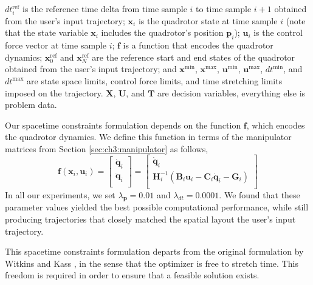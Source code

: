 $dt_i^{\text{ref}}$ is the reference time delta from time sample $i$ to time sample $i+1$ obtained from the user's input trajectory;
$\mathbf{x}_i$ is the quadrotor state at time sample $i$ (note that the state variable $\mathbf{x}_i$ includes the quadrotor's position $\mathbf{p}_i$);
$\mathbf{u}_i$ is the control force vector at time sample $i$;
$\mathbf{f}$ is a function that encodes the quadrotor dynamics;
$\mathbf{x}_0^{\text{ref}}$ and $\mathbf{x}_N^{\text{ref}}$ are the reference start and end states of the quadrotor obtained from the user's input trajectory;
and $\mathbf{x}^{\text{min}}$, $\mathbf{x}^{\text{max}}$, $\mathbf{u}^{\text{min}}$, $\mathbf{u}^{\text{max}}$, $dt^{\text{min}}$, and $dt^{\text{max}}$ are state space limits, control force limits, and time stretching limits imposed on the trajectory.
$\mathbf{X}$, $\mathbf{U}$, and $\mathbf{T}$ are decision variables, everything else is problem data.

Our spacetime constraints formulation depends on the function $\mathbf{f}$, which encodes the quadrotor dynamics.
We define this function in terms of the manipulator matrices from Section \ref{sec:ch3:manipulator} as follows,
%
\begin{equation}
\mathbf{f}(\mathbf{x}_i,\mathbf{u}_i) =
\begin{bmatrix}
\dot{\mathbf{q}}_i  \\
\ddot{\mathbf{q}}_i \\
\end{bmatrix} =
\begin{bmatrix}
\dot{\mathbf{q}}_i  \\
\mathbf{H}^{-1}_i( \mathbf{B}_i\mathbf{u}_i - \mathbf{C}_i\dot{\mathbf{q}}_i - \mathbf{G}_i) \\
\end{bmatrix}
\end{equation}
%
In all our experiments, we set $\lambda_\mathbf{p} = 0.01$ and $\lambda_{dt} = 0.0001$.
We found that these parameter values yielded the best possible computational performance, while still producing trajectories that closely matched the spatial layout the user's input trajectory.

This spacetime constraints formulation  departs from the original formulation by Witkins and Kass , in the sense that the optimizer is free to stretch time.
This freedom is required in order to ensure that a feasible solution exists.

